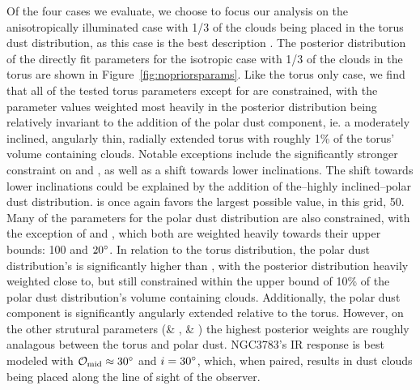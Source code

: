 \par Of the four cases we evaluate, we choose to focus our analysis on the anisotropically illuminated case with 1/3 of the clouds being placed in the torus dust distribution, as this case is the best description . The posterior distribution of the directly fit parameters for the isotropic case with 1/3 of the clouds in the torus are shown in Figure~\ref{fig:nopriorsparams}. Like the torus only case, we find that all of the tested torus parameters except for \Y are constrained, with the parameter values weighted most heavily in the posterior distribution being relatively invariant to the addition of the polar dust component, ie. a moderately inclined, angularly thin, radially extended torus with roughly 1\% of the torus' volume containing clouds. Notable exceptions include the significantly stronger constraint on \p and \sig, as well as a shift towards lower inclinations. The shift towards lower inclinations could be explained by the addition of the--highly inclined--polar dust distribution. \Y is once again favors the largest possible value, in this grid, 50. Many of the parameters for the polar dust distribution are also constrained, with the exception of \Ypol and \sigpol, which both are weighted heavily towards their upper bounds: 100 and $20\degree$. In relation to the torus distribution, the polar dust distribution's \vffpol is significantly higher than \vff, with the posterior distribution heavily weighted close to, but still constrained within the upper bound of 10\% of the polar dust distribution's volume containing clouds. Additionally, the polar dust component is significantly angularly extended relative to the torus. However, on the other strutural parameters (\p \& \ppol, \Y \& \Ypol) the highest posterior weights are roughly analagous between the torus and polar dust. NGC3783's IR response is best modeled with $\mathcal{O}_{\text{mid}} \approx 30\degree$ and $i = 30\degree$, which, when paired, results in dust clouds being placed along the line of sight of the observer. 

